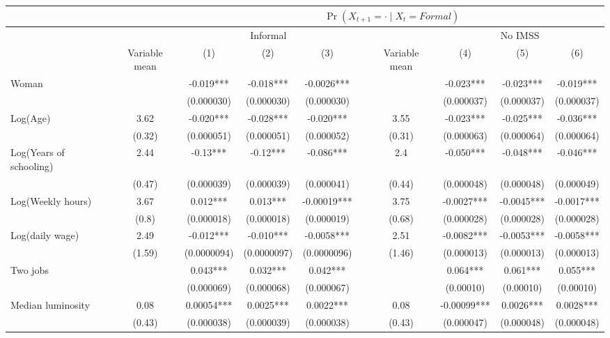 \begin{tabular}{lccccccccc}
\toprule
      &       & \multicolumn{8}{c}{$\Pr(X_{t+1} = \cdot \;|\; X_{t} = Formal)$} \\
\midrule
      &       & \multicolumn{3}{c}{Informal  } &       &       & \multicolumn{3}{c}{No IMSS} \\
\cmidrule{3-5}\cmidrule{8-10}      & Variable mean & (1)   & (2)   & (3)   &       & Variable mean & (4)   & (5)   & (6) \\
\midrule
\midrule
Woman &       & -0.019*** & -0.018*** & -0.0026*** &       &       & -0.023*** & -0.023*** & -0.019*** \\
      &       & (0.000030) & (0.000030) & (0.000030) &       &       & (0.000037) & (0.000037) & (0.000037) \\
Log(Age) & 3.62  & -0.020*** & -0.028*** & -0.020*** &       & 3.55  & -0.023*** & -0.025*** & -0.036*** \\
      & (0.32) & (0.000051) & (0.000051) & (0.000052) &       & (0.31) & (0.000063) & (0.000064) & (0.000064) \\
Log(Years of schooling) & 2.44  & -0.13*** & -0.12*** & -0.086*** &       & 2.4   & -0.050*** & -0.048*** & -0.046*** \\
      & (0.47) & (0.000039) & (0.000039) & (0.000041) &       & (0.44) & (0.000048) & (0.000048) & (0.000049) \\
Log(Weekly hours) & 3.67  & 0.012*** & 0.013*** & -0.00019*** &       & 3.75  & -0.0027*** & -0.0045*** & -0.0017*** \\
      & (0.8) & (0.000018) & (0.000018) & (0.000019) &       & (0.68) & (0.000028) & (0.000028) & (0.000028) \\
Log(daily wage) & 2.49  & -0.012*** & -0.010*** & -0.0058*** &       & 2.51  & -0.0082*** & -0.0053*** & -0.0058*** \\
      & (1.59) & (0.0000094) & (0.0000097) & (0.0000096) &       & (1.46) & (0.000013) & (0.000013) & (0.000013) \\
Two jobs &       & 0.043*** & 0.032*** & 0.042*** &       &       & 0.064*** & 0.061*** & 0.055*** \\
      &       & (0.000069) & (0.000068) & (0.000067) &       &       & (0.00010) & (0.00010) & (0.00010) \\
Median luminosity & 0.08  & 0.00054*** & 0.0025*** & 0.0022*** &       & 0.08  & -0.00099*** & 0.0026*** & 0.0028*** \\
      & (0.43) & (0.000038) & (0.000039) & (0.000038) &       & (0.43) & (0.000047) & (0.000048) & (0.000048) \\

\end{tabular}
